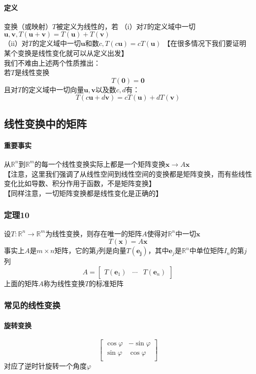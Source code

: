 \documentclass{article}
\newcommand{\ve}{\boldsymbol}
\begin{document}
\begin{CJK}{UTF8}{gkai}
\paragraph{定义\\}
变换（或映射）$T$被定义为线性的，若
（i）对$T$的定义域中一切$\ve{u},\ve{v},T(\ve{u}+\ve{v})=T(\ve{u})+T(\ve{v})$\\
（ii）对$T$的定义域中一切$\ve{u}$和数$c,T(c\ve{u})=cT(\ve{u})$
【在很多情况下我们要证明某个变换是线性变化就可以从定义出发】\\
我们不难由上述两个性质推出：\\
若$T$是线性变换\\
\[T(\ve{0})=\ve{0}\]
且对$T$的定义域中一切向量$\ve{u},\ve{v}$以及数$c,d$有：
\[T(c\ve{u}+d\ve{v})=cT(\ve{u})+dT(\ve{v})\]
\subsection{线性变换中的矩阵}
\paragraph{重要事实\\}
从$\mathbb{R}^n$到$\mathbb{R}^m$的每一个线性变换实际上都是一个矩阵变换$\ve{x}\to A\ve{x}$\\
【注意，这里我们强调了从线性空间到线性空间的变换都是矩阵变换，而有些线性变化比如导数、积分作用于函数，不是矩阵变换】\\
【同样注意，一切矩阵变换都是线性变化是正确的】\\
\subsubsection{定理10}
设$T:\mathbb{R}^n\to\mathbb{R}^m$为线性变换，则存在唯一的矩阵$A$使得对$\mathbb{R}^n$中一切$\ve{x}$
\[T(\ve{x})=A\ve{x}\]
事实上$A$是$m\times n$矩阵，它的第$j$列是向量$T(\ve{e_j})$，其中$\ve{e}_j$是$\mathbb{R}^n$中单位矩阵$I_n$的第$j$列\\
\[A=\begin{bmatrix}
    T(\ve{e}_1)&\cdots&T(\ve{e}_n)
\end{bmatrix}\]
上面的矩阵$A$称为线性变换$T$的标准矩阵\\
\subsubsection{常见的线性变换}
\paragraph{旋转变换\\}
\[\begin{bmatrix}
    \cos\varphi&-\sin\varphi\\
    \sin\varphi&\cos\varphi\\
\end{bmatrix}
\]
对应了逆时针旋转一个角度$\varphi$\\

\end{CJK}
\end{document}
